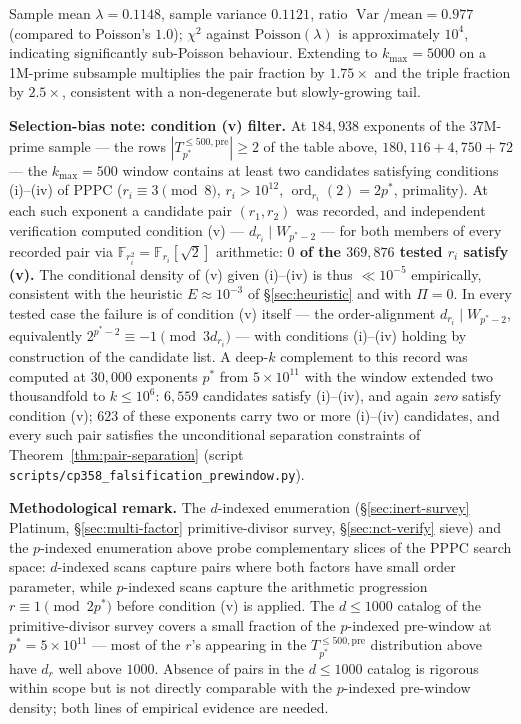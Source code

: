 \documentclass[11pt]{amsart}
\theoremstyle{plain}
\theoremstyle{definition}
\theoremstyle{remark}
\numberwithin{equation}{section}
\newcommand{\ord}{\operatorname{ord}}
\newcommand{\Var}{\operatorname{Var}}
\newcommand{\F}{\mathbb{F}}
\begin{document}
Sample mean $\lambda = 0.1148$, sample variance $0.1121$, ratio $\Var/\text{mean} = 0.977$ (compared to Poisson's $1.0$); $\chi^2$ against $\mathrm{Poisson}(\lambda)$ is approximately $10^4$, indicating significantly sub-Poisson behaviour. Extending to $k_{\max} = 5000$ on a 1M-prime subsample multiplies the pair fraction by $1.75 \times$ and the triple fraction by $2.5 \times$, consistent with a non-degenerate but slowly-growing tail.

\textbf{Selection-bias note: condition (v) filter.} At $184{,}938$ exponents of the $37$M-prime sample --- the rows $|T_{p^\ast}^{\leq 500,\mathrm{pre}}| \geq 2$ of the table above, $180{,}116 + 4{,}750 + 72$ --- the $k_{\max} = 500$ window contains at least two candidates satisfying conditions (i)--(iv) of PPPC ($r_i \equiv 3 \pmod 8$, $r_i > 10^{12}$, $\ord_{r_i}(2) = 2 p^\ast$, primality). At each such exponent a candidate pair $(r_1, r_2)$ was recorded, and independent verification computed condition (v) --- $d_{r_i} \mid W_{p^\ast - 2}$ --- for both members of every recorded pair via $\F_{r_i^2} = \F_{r_i}[\sqrt 2]$ arithmetic: \textbf{$0$ of the $369{,}876$ tested $r_i$ satisfy (v).} The conditional density of (v) given (i)--(iv) is thus $\ll 10^{-5}$ empirically, consistent with the heuristic $E \approx 10^{-3}$ of \S\ref{sec:heuristic} and with $\Pi = 0$. In every tested case the failure is of condition (v) itself --- the order-alignment $d_{r_i} \mid W_{p^\ast - 2}$, equivalently $2^{p^\ast - 2} \equiv -1 \pmod{3 d_{r_i}}$ --- with conditions (i)--(iv) holding by construction of the candidate list. A deep-$k$ complement to this record was computed at $30{,}000$ exponents $p^\ast$ from $5 \times 10^{11}$ with the window extended two thousandfold to $k \leq 10^6$: $6{,}559$ candidates satisfy (i)--(iv), and again \emph{zero} satisfy condition (v); $623$ of these exponents carry two or more (i)--(iv) candidates, and every such pair satisfies the unconditional separation constraints of Theorem~\ref{thm:pair-separation} (script \texttt{scripts/}\allowbreak\texttt{cp358\_falsification\_prewindow.py}).

\textbf{Methodological remark.} The $d$-indexed enumeration (\S\ref{sec:inert-survey} Platinum, \S\ref{sec:multi-factor} primitive-divisor survey, \S\ref{sec:nct-verify} sieve) and the $p$-indexed enumeration above probe complementary slices of the PPPC search space: $d$-indexed scans capture pairs where both factors have small order parameter, while $p$-indexed scans capture the arithmetic progression $r \equiv 1 \pmod{2 p^\ast}$ before condition (v) is applied. The $d \leq 1000$ catalog of the primitive-divisor survey covers a small fraction of the $p$-indexed pre-window at $p^\ast = 5 \times 10^{11}$ --- most of the $r$'s appearing in the $T_{p^\ast}^{\leq 500,\mathrm{pre}}$ distribution above have $d_r$ well above $1000$. Absence of pairs in the $d \leq 1000$ catalog is rigorous within scope but is not directly comparable with the $p$-indexed pre-window density; both lines of empirical evidence are needed.
\end{document}
